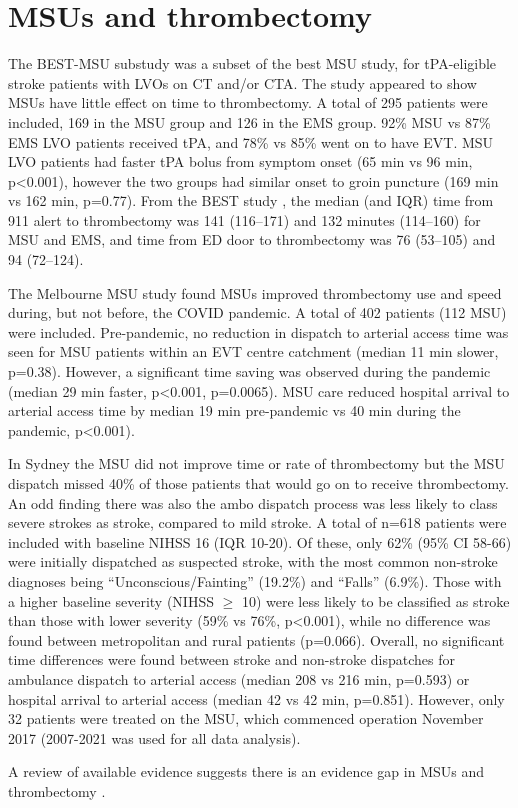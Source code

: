 \section{MSUs and thrombectomy}

The BEST-MSU substudy \cite{czap_abstract_2022} was a subset of the best MSU study, for tPA-eligible stroke patients with LVOs on CT and/or CTA. The study appeared to show MSUs have little effect on time to thrombectomy. A total of 295 patients were included, 169 in the MSU group and 126 in the EMS group. 92\% MSU vs 87\% EMS LVO patients received tPA, and 78\% vs 85\% went on to have EVT. MSU LVO patients had faster tPA bolus from symptom onset (65 min vs 96 min, p<0.001), however the two groups had similar onset to groin puncture (169 min vs 162 min, p=0.77). From the BEST study \cite{grotta_prospective_2021}, the median (and IQR) time from 911 alert to  thrombectomy was 141 (116–171) and 132 minutes (114–160) for MSU and EMS, and  time from ED door to thrombectomy was 76 (53–105) and 94 (72–124).


The Melbourne MSU study \cite{menezes_abstract_2023} found MSUs improved thrombectomy use and speed during, but not before, the COVID pandemic. A total of 402 patients (112 MSU) were included. Pre-pandemic, no reduction in dispatch to arterial access time was seen for MSU patients within an EVT centre catchment (median 11 min slower, p=0.38). However, a significant time saving was observed during the pandemic (median 29 min faster, p<0.001, p=0.0065). MSU care reduced hospital arrival to arterial access time by median 19 min pre-pandemic vs 40 min during the pandemic, p<0.001).

In Sydney the MSU did not improve time or rate of thrombectomy \cite{haliem_abstract_2023} but the MSU dispatch missed 40\% of those patients that would go on to receive thrombectomy. An odd finding there was also the ambo dispatch process was less likely to class severe strokes as stroke, compared to mild stroke. A total of n=618 patients were included with baseline NIHSS 16 (IQR 10-20). Of these, only 62\% (95\% CI 58-66) were initially dispatched as suspected stroke, with the most common non-stroke diagnoses being “Unconscious/Fainting” (19.2\%) and “Falls” (6.9\%). Those with a higher baseline severity (NIHSS $\ge$ 10) were less likely to be classified as stroke than those with lower severity (59\% vs 76\%, p<0.001), while no difference was found between metropolitan and rural patients (p=0.066). Overall, no significant time differences were found between stroke and non-stroke dispatches for ambulance dispatch to arterial access (median 208 vs 216 min, p=0.593) or hospital arrival to arterial access (median 42 vs 42 min, p=0.851). However, only 32 patients were treated on the MSU, which commenced operation November 2017 (2007-2021 was used for all data analysis). 


A review of available evidence suggests there is an evidence gap in MSUs and thrombectomy \cite{navi_mobile_2022}.